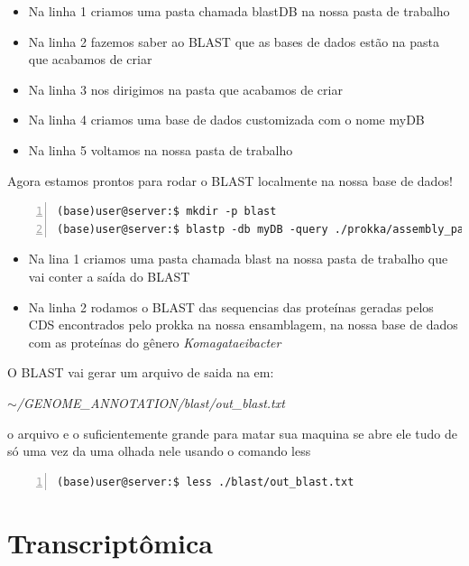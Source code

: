\documentclass[letter,11pt]{book}
\begin{document}
\begin{itemize}
\item Na linha 1 criamos uma pasta chamada blastDB na nossa pasta de trabalho
\item Na linha 2 fazemos saber ao BLAST que as bases de dados estão na pasta que acabamos de criar 
\item Na linha 3 nos dirigimos na pasta que acabamos de criar
\item Na linha 4 criamos uma base de dados customizada com o nome myDB
\item Na linha 5 voltamos na nossa pasta de trabalho
\end{itemize}

Agora estamos prontos para rodar o BLAST localmente na nossa base de dados!

\begin{Verbatim}[commandchars=!\{\}, numbers=left,label= Rondando blast local,frame=topline,fontsize=\scriptsize]
(base)user@server:$ mkdir -p blast
(base)user@server:$ blastp -db myDB -query ./prokka/assembly_pacbio.faa -out ./blast/out_blast.txt
\end{Verbatim}
\begin{itemize}
\item Na lina 1 criamos uma pasta chamada blast na nossa pasta de trabalho que vai conter a saída do BLAST
\item Na linha 2 rodamos o BLAST das sequencias das proteínas geradas pelos CDS encontrados pelo prokka na nossa ensamblagem, na nossa base de dados com as proteínas do gênero  \emph{Komagataeibacter}
\end{itemize}

O BLAST vai gerar um arquivo de saida na em:


\emph{$\sim$/GENOME\_ANNOTATION/blast/out\_blast.txt}

o arquivo e o suficientemente grande para matar sua maquina se abre ele tudo de só uma vez
da uma olhada nele usando o comando less


\begin{Verbatim}[commandchars=!\{\}, numbers=left,label= Resultados do BLAST local,frame=topline,fontsize=\scriptsize]
(base)user@server:$ less ./blast/out_blast.txt
\end{Verbatim}

\chapter{Transcriptômica}
\end{document}
